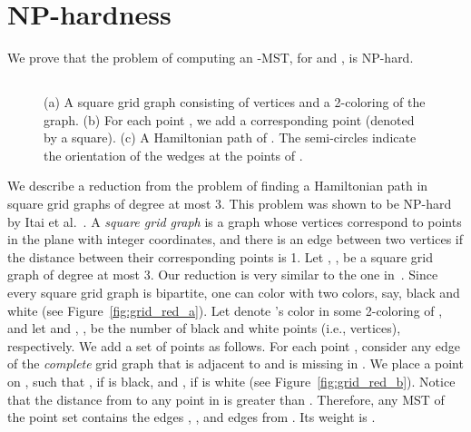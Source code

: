 \documentclass[11pt]{article}
\begin{document}
\section{NP-hardness}\label{sec:np_hardness}

We prove that the problem of computing an -MST, for  and , is NP-hard.

\subsection{}

\begin{figure}[htb]
\centering
  \hspace{.75cm}
  \hspace{.75cm}
 	\caption{(a) A square grid graph  consisting of  vertices and a 2-coloring of the graph. (b) For each point , we add a corresponding point  (denoted by a square). (c) A Hamiltonian path of . The semi-circles indicate the orientation of the wedges at the points of .}
 	\label{fig:reduction180}	
\end{figure} 

We describe a reduction from the problem of finding a Hamiltonian path in square grid graphs of degree at most 3. This problem was shown to be NP-hard by Itai et al.~\cite{IPS82}.
A {\em square grid graph} is a graph whose vertices correspond to points in the plane with integer coordinates, and there is an edge between two vertices if the distance between their corresponding points is 1. 
Let , , be a square grid graph of degree at most 3. Our reduction is very similar to the one in~\cite{PV84}. Since every square grid graph is bipartite, one can color  with two colors, say, black and white (see Figure~\ref{fig:grid_red_a}). Let  denote 's color in some 2-coloring of , and let  and , , be the number of black and white points (i.e., vertices), respectively. 
We add a set  of  points as follows. For each point , consider any edge  of the {\em complete} grid graph that is adjacent to  and is missing in . We place a point  on , such that , if  is black, and , if  is white (see Figure~\ref{fig:grid_red_b}). Notice that the distance from  to any point in  is greater than . 
Therefore, any MST of the point set  contains the  edges , , and  edges from . Its weight is .
\end{document}
